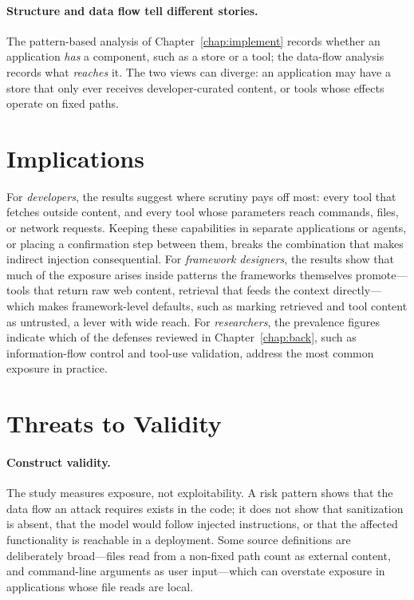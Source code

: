 \paragraph{Structure and data flow tell different stories.} The pattern-based analysis of Chapter~\ref{chap:implement} records whether an application \emph{has} a component, such as a store or a tool; the data-flow analysis records what \emph{reaches} it. The two views can diverge: an application may have a store that only ever receives developer-curated content, or tools whose effects operate on fixed paths. 

\section{Implications}
\label{sec:disc-implications}

For \emph{developers}, the results suggest where scrutiny pays off most: every tool that fetches outside content, and every tool whose parameters reach commands, files, or network requests. Keeping these capabilities in separate applications or agents, or placing a confirmation step between them, breaks the combination that makes indirect injection consequential. For \emph{framework designers}, the results show that much of the exposure arises inside patterns the frameworks themselves promote---tools that return raw web content, retrieval that feeds the context directly---which makes framework-level defaults, such as marking retrieved and tool content as untrusted, a lever with wide reach. For \emph{researchers}, the prevalence figures indicate which of the defenses reviewed in Chapter~\ref{chap:back}, such as information-flow control and tool-use validation, address the most common exposure in practice.

\section{Threats to Validity}
\label{sec:disc-threats}

\paragraph{Construct validity.} The study measures exposure, not exploitability. A risk pattern shows that the data flow an attack requires exists in the code; it does not show that sanitization is absent, that the model would follow injected instructions, or that the affected functionality is reachable in a deployment. Some source definitions are deliberately broad---files read from a non-fixed path count as external content, and command-line arguments as user input---which can overstate exposure in applications whose file reads are local.

